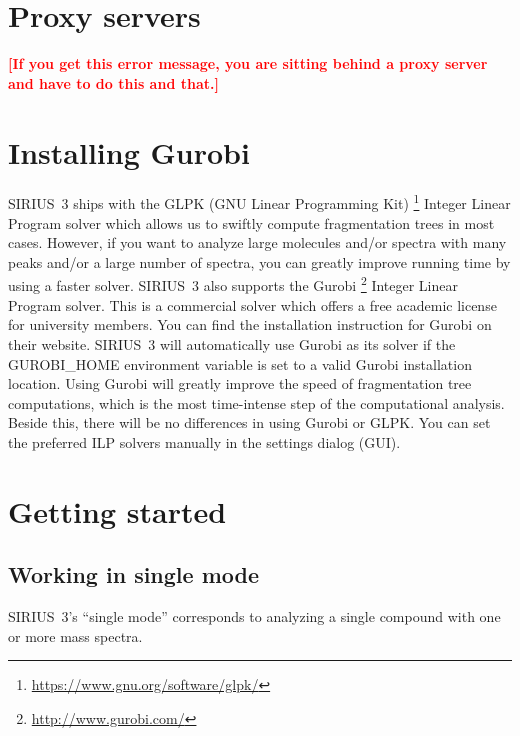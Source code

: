 \documentclass[letterpaper,10pt,openany,oneside]{sphinxmanual}
\newcommand{\todo}[1]{\xspace{\bfseries\sffamily\textcolor{red}{[#1]}}\xspace}
\begin{document}
\section{Proxy servers}
\label{install:proxy}

\todo{If you get this error message, you are sitting behind a proxy server
  and have to do this and that.}



\section{Installing Gurobi}
\label{install:gurobi}

SIRIUS~3 ships with the GLPK (GNU Linear Programming Kit)
\footnote{\sphinxAtStartFootnote\url{https://www.gnu.org/software/glpk/}} 
Integer Linear Program solver which allows us to swiftly compute
fragmentation trees in most cases.  However, if you want to analyze large
molecules and/or spectra with many peaks and/or a large number of spectra,
you can greatly improve running time by using a faster solver.  SIRIUS~3 also
supports the Gurobi
\footnote{\sphinxAtStartFootnote\url{http://www.gurobi.com/}} 
Integer Linear Program solver.  This is a commercial solver which offers a
free academic license for university members.  You can find the installation
instruction for Gurobi on their website.  SIRIUS~3 will automatically use
Gurobi as its solver if the GUROBI\_HOME environment variable is set to a
valid Gurobi installation location.  Using Gurobi will greatly improve the
speed of fragmentation tree computations, which is the most time-intense step
of the computational analysis.  Beside this, there will be no differences in
using Gurobi or GLPK.  You can set the preferred ILP solvers manually in the
settings dialog (GUI).



\section{Getting started}

\subsection{Working in single mode}
\label{gui:working-in-single-mode}

SIRIUS~3's ``single mode'' corresponds to analyzing a single compound with
one or more mass spectra.
\end{document}
